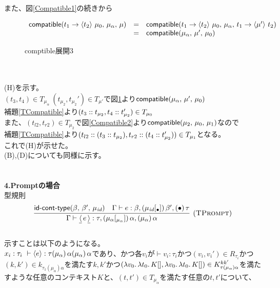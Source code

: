 \documentclass[japanese,draft]{jssst_ppl} %
\begin{document}
また、図\ref{Compatible1}の続きから\\
\begin{figure}[h]
\[
\begin{array}{lcl}
  \Compatible{\Trail{t_1}{\mu_0}{t_2}}{\mu_{\alpha}}{\mu} &=& \Compatible{\Trail{t_1}{\mu_0}{t_2}}{\mu_{\alpha}}{\Trail{t_1}{t_2}{\mu'}}\\
  &=& \Compatible{\mu_{\alpha}}{\mu'}{\mu_0}
\end{array}
\]
\caption{\textsf{comptible}展開3}
\label{Compatible3}
\end{figure}\\
\\
(H)を示す。\\
$(t_3,t_4)\in T_{\mu_{\alpha}}\ (t_{\mu_2},t_{\mu_2}')\in T_{\mu'}$で図\ref{Compatible3}より$\Compatible{\mu_{\alpha}}{\mu'}{\mu_0}$\\
補題\ref{TCompatible}より$(\Cons{t_3}{t_{\mu_2}},\Cons{t_4}{t_{\mu_2}'})\in T_{\mu_0}$\\
また、$(t_{l2},t_{r2})\in T_{\mu_2}$で図\ref{Compatible2}より$\Compatible{\mu_2}{\mu_0}{\mu_1}$なので\\
補題\ref{TCompatible}より$(\Cons{t_{l2}}{\ConsP{t_3}{t_{\mu_2}}},\Cons{t_{r2}}{\ConsP{t_4}{t_{\mu_2}'}})\in T_{\mu_1}$となる。\\
これで(H)が示せた。\\
(B),(D)についても同様に示す。\\
\\
\\
\textbf{4.Promptの場合}\\
型規則
\[
\begin{array}{c}
  \infer[\TPrompt]
      {\JudgeTrail{\Gamma}{\DReset{e}}{\tau}{\TrailsType{\alpha}{\alpha}}
                                            {\TrailType{\alpha}}}
      {\IsIdTrail{\beta}{\beta'}{\MuId}
      &\JudgeTrail{\Gamma}{e}{\beta}
                  {\TsType{\MuId}{\beta'}{\Bullet}}
                  {\TType{\Bullet}{\tau}}}
\end{array}
\]
\\
示すことは以下のようになる。\\
$x_i:\tau_i\ \vdash \Prompt{e}:\tau \TrailType{\alpha} \TrailType{\alpha}$であり、かつ各$v_i$が$\vdash v_i:\tau_i$かつ$(v_i,v_i') \in R_{\tau_i}$かつ\\
$(k,k')\in k_{\tau_1(\mu_{\alpha})\alpha}$を満たす$k,k'$かつ$(\Lam{v_0}{\Lam{t_0}{K[]}}, \Lam{v_0}{\Lam{t_0}{K[]}})\in  K^{kk'}_{\tau(\mu_{\alpha})\alpha}$を満たすような任意のコンテキスト$K$と、$(t, t') \in T_{\mu_{\alpha}}$を満たす任意の$t, t'$について、\\
\end{document}
